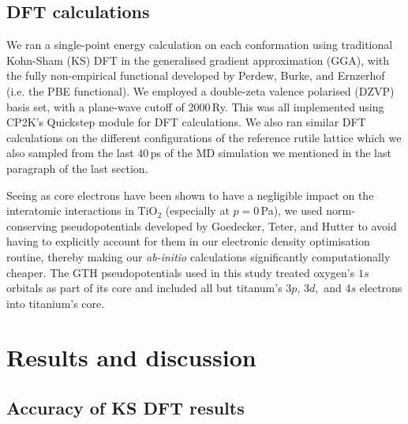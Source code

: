\documentclass[aps,prb,twocolumn,amsmath,amssymb,superscriptaddress,longbibliography]{revtex4-1}
\newcommand\tab[1][1cm]{\hspace*{#1}} %
\begin{document}
\subsection{DFT calculations}

\tab We ran a single-point energy calculation on each conformation using traditional Kohn-Sham (KS) DFT in the generalised gradient approximation (GGA), with the fully non-empirical functional developed by Perdew, Burke, and Ernzerhof\cite{pbe} (i.e. the PBE functional).
We employed a double-zeta valence polarised (DZVP) basis set, with a plane-wave cutoff of 2000$\,$Ry. 
This was all implemented using \textsc{CP2K}'s Quickstep module for DFT calculations\cite{quickstep}.
We also ran similar DFT calculations on the different configurations of the reference rutile lattice which we also sampled from the last $40\,$ps of the MD simulation we mentioned in the last paragraph of the last section.

\tab Seeing as core electrons have been shown to have a negligible impact on the interatomic interactions in $\text{TiO}_2$\cite{comp_exptl3,electronic_structure} (especially at $p=0\,$Pa), we used norm-conserving pseudopotentials developed by Goedecker, Teter, and Hutter\cite{gth} to avoid having to explicitly account for them in our electronic density optimisation routine, thereby making our \textit{ab-initio} calculations significantly computationally cheaper.
The GTH pseudopotentials used in this study treated oxygen's $1s$ orbitals as part of its core and included all but titanum's $3p,\,3d,$ and $4s$ electrons into titanium's core.


\section{Results and discussion}

\subsection{Accuracy of KS DFT results}
\end{document}
